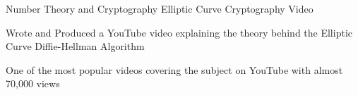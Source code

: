 \begin{cventries}
    \cventry
    {Number Theory and Cryptography} %
    {Elliptic Curve Cryptography Video} %
    {} %
    {} %
    {
      \begin{cvitems} %
        \item {Wrote and Produced a YouTube video explaining the theory behind the Elliptic Curve Diffie-Hellman Algorithm}
        \item {One of the most popular videos covering the subject on YouTube with almost 70,000 views}
      \end{cvitems}
    }

\end{cventries}
